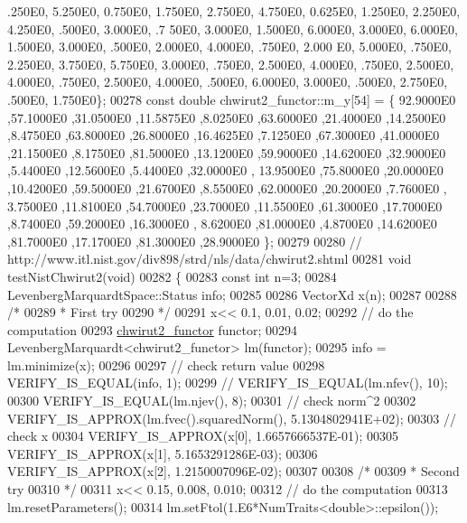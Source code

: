 \begin{DoxyCode}
      .250E0, 5.250E0, 0.750E0, 1.750E0, 2.750E0, 4.750E0, 0.625E0, 1.250E0, 2.250E0, 4.250E0, .500E0, 3.000E0, .7
      50E0, 3.000E0, 1.500E0, 6.000E0, 3.000E0, 6.000E0, 1.500E0, 3.000E0, .500E0, 2.000E0, 4.000E0, .750E0, 2.000
      E0, 5.000E0, .750E0, 2.250E0, 3.750E0, 5.750E0, 3.000E0, .750E0, 2.500E0, 4.000E0, .750E0, 2.500E0, 4.000E0,
       .750E0, 2.500E0, 4.000E0, .500E0, 6.000E0, 3.000E0, .500E0, 2.750E0, .500E0, 1.750E0\};
00278 \textcolor{keyword}{const} \textcolor{keywordtype}{double} chwirut2\_functor::m\_y[54] = \{ 92.9000E0 ,57.1000E0 ,31.0500E0 ,11.5875E0 ,8.0250E0 ,63.6000E0 
      ,21.4000E0 ,14.2500E0 ,8.4750E0 ,63.8000E0 ,26.8000E0 ,16.4625E0 ,7.1250E0 ,67.3000E0 ,41.0000E0 ,21.1500E0 
      ,8.1750E0 ,81.5000E0 ,13.1200E0 ,59.9000E0 ,14.6200E0 ,32.9000E0 ,5.4400E0 ,12.5600E0 ,5.4400E0 ,32.0000E0 ,
      13.9500E0 ,75.8000E0 ,20.0000E0 ,10.4200E0 ,59.5000E0 ,21.6700E0 ,8.5500E0 ,62.0000E0 ,20.2000E0 ,7.7600E0 ,
      3.7500E0 ,11.8100E0 ,54.7000E0 ,23.7000E0 ,11.5500E0 ,61.3000E0 ,17.7000E0 ,8.7400E0 ,59.2000E0 ,16.3000E0 ,
      8.6200E0 ,81.0000E0 ,4.8700E0 ,14.6200E0 ,81.7000E0 ,17.1700E0 ,81.3000E0 ,28.9000E0  \};
00279 
00280 \textcolor{comment}{// http://www.itl.nist.gov/div898/strd/nls/data/chwirut2.shtml}
00281 \textcolor{keywordtype}{void} testNistChwirut2(\textcolor{keywordtype}{void})
00282 \{
00283   \textcolor{keyword}{const} \textcolor{keywordtype}{int} n=3;
00284   LevenbergMarquardtSpace::Status info;
00285 
00286   VectorXd x(n);
00287 
00288   \textcolor{comment}{/*}
00289 \textcolor{comment}{   * First try}
00290 \textcolor{comment}{   */}
00291   x<< 0.1, 0.01, 0.02;
00292   \textcolor{comment}{// do the computation}
00293   \hyperlink{structchwirut2__functor}{chwirut2\_functor} functor;
00294   LevenbergMarquardt<chwirut2\_functor> lm(functor);
00295   info = lm.minimize(x);
00296 
00297   \textcolor{comment}{// check return value}
00298   VERIFY\_IS\_EQUAL(info, 1);
00299 \textcolor{comment}{//   VERIFY\_IS\_EQUAL(lm.nfev(), 10);}
00300   VERIFY\_IS\_EQUAL(lm.njev(), 8);
00301   \textcolor{comment}{// check norm^2}
00302   VERIFY\_IS\_APPROX(lm.fvec().squaredNorm(), 5.1304802941E+02);
00303   \textcolor{comment}{// check x}
00304   VERIFY\_IS\_APPROX(x[0], 1.6657666537E-01);
00305   VERIFY\_IS\_APPROX(x[1], 5.1653291286E-03);
00306   VERIFY\_IS\_APPROX(x[2], 1.2150007096E-02);
00307 
00308   \textcolor{comment}{/*}
00309 \textcolor{comment}{   * Second try}
00310 \textcolor{comment}{   */}
00311   x<< 0.15, 0.008, 0.010;
00312   \textcolor{comment}{// do the computation}
00313   lm.resetParameters();
00314   lm.setFtol(1.E6*NumTraits<double>::epsilon());

\end{DoxyCode}
